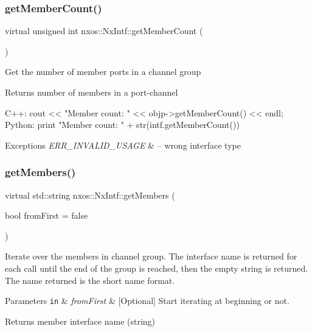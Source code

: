 \subsubsection{\texorpdfstring{get\+Member\+Count()}{getMemberCount()}}
{\footnotesize\ttfamily virtual unsigned int nxos\+::\+Nx\+Intf\+::get\+Member\+Count (\begin{DoxyParamCaption}{ }\end{DoxyParamCaption})\hspace{0.3cm}{\ttfamily [pure virtual]}}

Get the number of member ports in a channel group

\begin{DoxyReturn}{Returns}
number of members in a port-\/channel
\end{DoxyReturn}

\begin{DoxyCode}
C++:
       cout << \textcolor{stringliteral}{"Member count: "} << objp->getMemberCount() << endl;
Python:
       print \textcolor{stringliteral}{"Member count: "} + str(intf.getMemberCount())
\end{DoxyCode}



\begin{DoxyExceptions}{Exceptions}
{\em E\+R\+R\+\_\+\+I\+N\+V\+A\+L\+I\+D\+\_\+\+U\+S\+A\+GE} & -- wrong interface type \\
\hline
\end{DoxyExceptions}
\mbox{\label{classnxos_1_1_nx_intf_a7c197b62e8135c8b78aa8fbf8958f9a2}} 
\subsubsection{\texorpdfstring{get\+Members()}{getMembers()}}
{\footnotesize\ttfamily virtual std\+::string nxos\+::\+Nx\+Intf\+::get\+Members (\begin{DoxyParamCaption}\item[{bool}]{from\+First = {\ttfamily false} }\end{DoxyParamCaption})\hspace{0.3cm}{\ttfamily [pure virtual]}}

Iterate over the members in channel group. The interface name is returned for each call until the end of the group is reached, then the empty string is returned. The name returned is the short name format. 
\begin{DoxyParams}[1]{Parameters}
\mbox{\tt in}  & {\em from\+First} & \mbox{[}Optional\mbox{]} Start iterating at beginning or not. \\
\hline
\end{DoxyParams}
\begin{DoxyReturn}{Returns}
member interface name (string)
\end{DoxyReturn}

